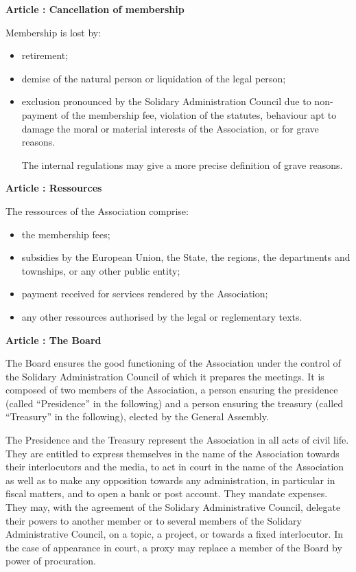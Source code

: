 \documentclass [11pt]{article}
\renewcommand {\section}[1]{\stepcounter {section}%
{\vspace {1em}\noindent\Large \bf Article \thesection: #1 \par}}
\begin{document}
\section {Cancellation of membership}

Membership is lost by:
\begin {itemize}
\item
retirement;
\item
demise of the natural person or liquidation of the legal person;
\item
exclusion pronounced by the Solidary Administration Council
due to non-payment of the membership fee, violation of the statutes,
behaviour apt to damage the moral or material interests of the Association,
or for grave reasons.

The internal regulations may give a more precise
definition of grave reasons.
\end {itemize}


\newpage
\section {Ressources}

The ressources of the Association comprise:
\begin {itemize}
\item
the membership fees;
\item
subsidies by the European Union, the State, the regions, the departments
and townships, or any other public entity;
\item
payment received for services rendered by the Association;
\item
any other ressources authorised by the legal or reglementary texts.
\end {itemize}


\section {The Board}

The Board ensures the good functioning of the Association under the control
of the Solidary Administration Council of which it prepares the meetings.
It is composed of two members of the Association, a person ensuring the
presidence (called ``Presidence'' in the following) and a person ensuring the
treasury (called ``Treasury'' in the following), elected by the General
Assembly.

The Presidence and the Treasury represent the Association in all acts of
civil life. They are entitled to express themselves in the name of the
Association towards their interlocutors and the media, to act in court
in the name of the Association as well as to make any opposition towards
any administration, in particular in fiscal matters, and to open a bank
or post account. They mandate expenses.
They may, with the agreement of the Solidary Administrative Council,
delegate their powers to another member or to several members of the
Solidary Administrative Council, on a topic, a project, or towards a
fixed interlocutor. In the case of appearance in court, a proxy may replace
a member of the Board by power of procuration.
\end{document}
